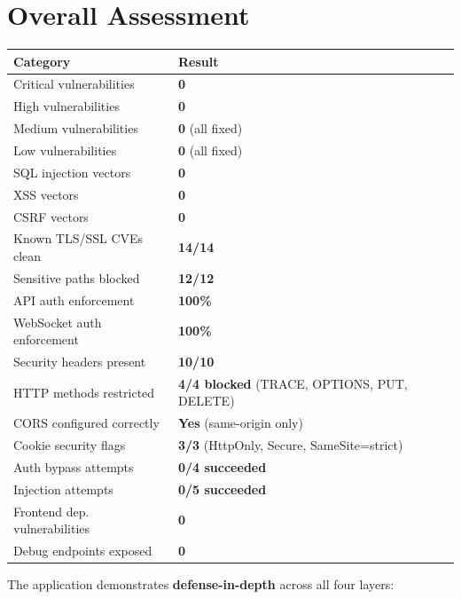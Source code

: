 \documentclass[12pt,a4paper]{article}
\begin{document}
\section{Overall Assessment}

\begin{center}
\begin{tabular}{ll}
\toprule
\textbf{Category} & \textbf{Result} \\
\midrule
Critical vulnerabilities & \textbf{0} \\
High vulnerabilities & \textbf{0} \\
Medium vulnerabilities & \textbf{0} (all fixed) \\
Low vulnerabilities & \textbf{0} (all fixed) \\
SQL injection vectors & \textbf{0} \\
XSS vectors & \textbf{0} \\
CSRF vectors & \textbf{0} \\
Known TLS/SSL CVEs clean & \textbf{14/14} \\
Sensitive paths blocked & \textbf{12/12} \\
API auth enforcement & \textbf{100\%} \\
WebSocket auth enforcement & \textbf{100\%} \\
Security headers present & \textbf{10/10} \\
HTTP methods restricted & \textbf{4/4 blocked} (TRACE, OPTIONS, PUT, DELETE) \\
CORS configured correctly & \textbf{Yes} (same-origin only) \\
Cookie security flags & \textbf{3/3} (HttpOnly, Secure, SameSite=strict) \\
Auth bypass attempts & \textbf{0/4 succeeded} \\
Injection attempts & \textbf{0/5 succeeded} \\
Frontend dep. vulnerabilities & \textbf{0} \\
Debug endpoints exposed & \textbf{0} \\
\bottomrule
\end{tabular}
\end{center}

\vspace{1em}

The application demonstrates \textbf{defense-in-depth} across all four layers:
\end{document}
